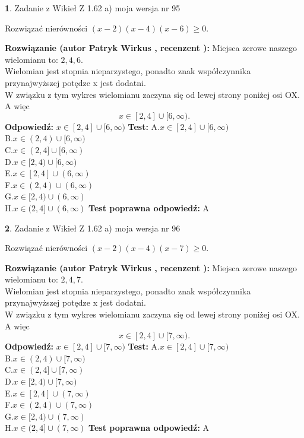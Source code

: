 \documentclass[12pt, a4paper]{article}
\theoremstyle{definition} %
\newtheorem{zad}{}
\newcommand{\zadStart}[1]{\begin{zad}#1\newline}
\newcommand{\zadStop}{\end{zad}}
\newcommand{\rozwStart}[2]{\noindent \textbf{Rozwiązanie (autor #1 , recenzent #2): }\newline}
\newcommand{\rozwStop}{\newline}
\newcommand{\odpStart}{\noindent \textbf{Odpowiedź:}\newline}
\newcommand{\odpStop}{\newline}
\newcommand{\testStart}{\noindent \textbf{Test:}\newline}
\newcommand{\testStop}{\newline}
\newcommand{\kluczStart}{\noindent \textbf{Test poprawna odpowiedź:}\newline}
\newcommand{\kluczStop}{\newline}
\begin{document}
\zadStart{Zadanie z Wikieł Z 1.62 a) moja wersja nr 95}

Rozwiązać nierówności $(x-2)(x-4)(x-6)\ge0$.
\zadStop
\rozwStart{Patryk Wirkus}{}
Miejsca zerowe naszego wielomianu to: $2, 4, 6$.\\
Wielomian jest stopnia nieparzystego, ponadto znak współczynnika przy\linebreak najwyższej potędze x jest dodatni.\\ W związku z tym wykres wielomianu zaczyna się od lewej strony poniżej osi OX. A więc $$x \in [2,4] \cup [6,\infty).$$
\rozwStop
\odpStart
$x \in [2,4] \cup [6,\infty)$
\odpStop
\testStart
A.$x \in [2,4] \cup [6,\infty)$\\
B.$x \in (2,4) \cup [6,\infty)$\\
C.$x \in (2,4] \cup [6,\infty)$\\
D.$x \in [2,4) \cup [6,\infty)$\\
E.$x \in [2,4] \cup (6,\infty)$\\
F.$x \in (2,4) \cup (6,\infty)$\\
G.$x \in [2,4) \cup (6,\infty)$\\
H.$x \in (2,4] \cup (6,\infty)$
\testStop
\kluczStart
A
\kluczStop



\zadStart{Zadanie z Wikieł Z 1.62 a) moja wersja nr 96}

Rozwiązać nierówności $(x-2)(x-4)(x-7)\ge0$.
\zadStop
\rozwStart{Patryk Wirkus}{}
Miejsca zerowe naszego wielomianu to: $2, 4, 7$.\\
Wielomian jest stopnia nieparzystego, ponadto znak współczynnika przy\linebreak najwyższej potędze x jest dodatni.\\ W związku z tym wykres wielomianu zaczyna się od lewej strony poniżej osi OX. A więc $$x \in [2,4] \cup [7,\infty).$$
\rozwStop
\odpStart
$x \in [2,4] \cup [7,\infty)$
\odpStop
\testStart
A.$x \in [2,4] \cup [7,\infty)$\\
B.$x \in (2,4) \cup [7,\infty)$\\
C.$x \in (2,4] \cup [7,\infty)$\\
D.$x \in [2,4) \cup [7,\infty)$\\
E.$x \in [2,4] \cup (7,\infty)$\\
F.$x \in (2,4) \cup (7,\infty)$\\
G.$x \in [2,4) \cup (7,\infty)$\\
H.$x \in (2,4] \cup (7,\infty)$
\testStop
\kluczStart
A
\kluczStop
\end{document}
